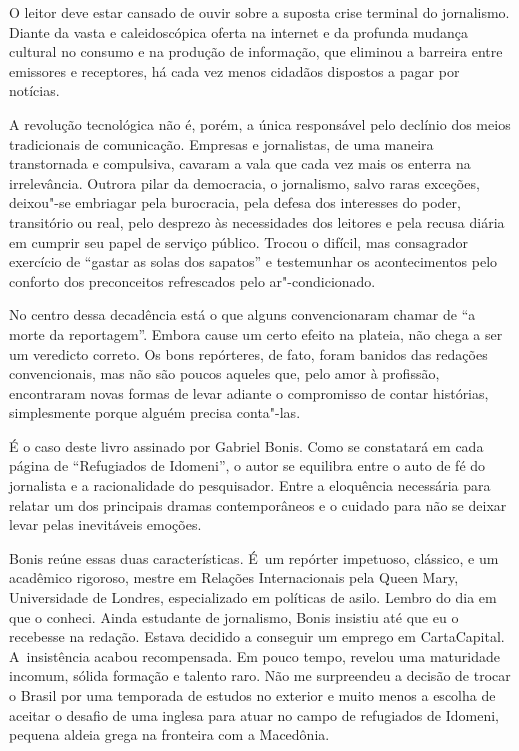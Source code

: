  

O leitor deve estar cansado de ouvir sobre a suposta crise terminal do
jornalismo. Diante da vasta e caleidoscópica oferta na internet e da
profunda mudança cultural no consumo e na produção de informação, que
eliminou a barreira entre emissores e receptores, há cada vez menos
cidadãos dispostos a pagar por notícias.

A revolução tecnológica não é, porém, a única responsável pelo declínio
dos meios tradicionais de comunicação. Empresas e jornalistas, de uma
maneira transtornada e compulsiva, cavaram a vala que cada vez mais os
enterra na irrelevância. Outrora pilar da democracia, o jornalismo,
salvo raras exceções, deixou"-se embriagar pela burocracia, pela defesa
dos interesses do poder, transitório ou real, pelo desprezo às
necessidades dos leitores e pela recusa diária em cumprir seu papel de
serviço público. Trocou o difícil, mas consagrador exercício de ``gastar
as solas dos sapatos'' e testemunhar os acontecimentos pelo conforto dos
preconceitos refrescados pelo ar"-condicionado.

No centro dessa decadência está o que alguns convencionaram chamar de
``a morte da reportagem''. Embora cause um certo efeito na plateia, não
chega a ser um veredicto correto. Os bons repórteres, de fato, foram
banidos das redações convencionais, mas não são poucos aqueles que, pelo
amor à profissão, encontraram novas formas de levar adiante o
compromisso de contar histórias, simplesmente porque alguém precisa
conta"-las.

É o caso deste livro assinado por Gabriel Bonis. Como se constatará em
cada página de ``Refugiados de Idomeni'', o autor se equilibra entre o
auto de fé do jornalista e a racionalidade do pesquisador. Entre a
eloquência necessária para relatar um dos principais dramas
contemporâneos e o cuidado para não se deixar levar pelas inevitáveis
emoções.

Bonis reúne essas duas características. É~um repórter impetuoso,
clássico, e um acadêmico rigoroso, mestre em Relações Internacionais
pela Queen Mary, Universidade de Londres, especializado em políticas de
asilo. Lembro do dia em que o conheci. Ainda estudante de jornalismo,
Bonis insistiu até que eu o recebesse na redação. Estava decidido a
conseguir um emprego em CartaCapital. A~insistência acabou recompensada.
Em pouco tempo, revelou uma maturidade incomum, sólida formação e
talento raro. Não me surpreendeu a decisão de trocar o Brasil por uma
temporada de estudos no exterior e muito menos a escolha de aceitar o
desafio de uma  inglesa para atuar no campo de refugiados de Idomeni,
pequena aldeia grega na fronteira com a Macedônia.


